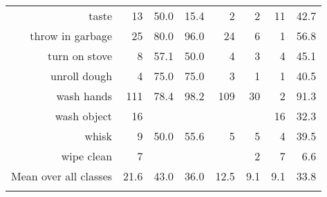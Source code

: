 \begin{tabular}{r r r@{\ \ }r@{\ \ }r@{\ \ }r@{\ \ }r r}
taste & 13 & 50.0 & 15.4 & 2 & 2 & 11 & 42.7 \\
throw in garbage & 25 & 80.0 & 96.0 & 24 & 6 & 1 & 56.8 \\
turn on stove & 8 & 57.1 & 50.0 & 4 & 3 & 4 & 45.1 \\
unroll dough & 4 & 75.0 & 75.0 & 3 & 1 & 1 & 40.5 \\
wash hands & 111 & 78.4 & 98.2 & 109 & 30 & 2 & 91.3 \\
wash object & 16 &  &  &  &  & 16 & 32.3 \\
whisk & 9 & 50.0 & 55.6 & 5 & 5 & 4 & 39.5 \\
wipe clean & 7 &  &  &  & 2 & 7 & 6.6 \\
\cmidrule(lr){1-1} \cmidrule(lr){2-2} \cmidrule(lr){3-7} \cmidrule(lr){8-8}
Mean over all classes&21.6&43.0&36.0&12.5&9.1&9.1&33.8
\\ \bottomrule \\ \end{tabular}
